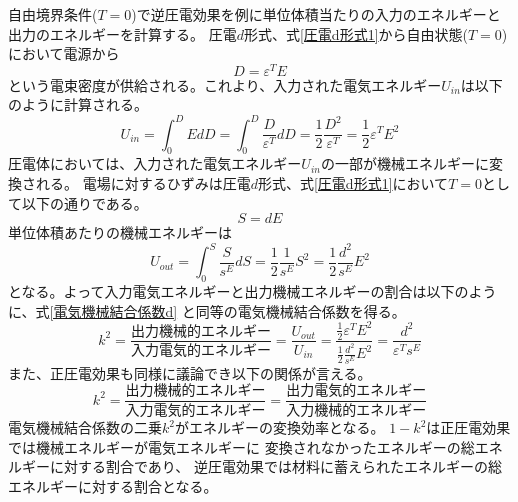 \documentclass[dvipdfmx,12pt,a4paper]{jreport}
\begin{document}
			自由境界条件($T=0$)で逆圧電効果を例に単位体積当たりの入力のエネルギーと出力のエネルギーを計算する。
			圧電$d$形式、式\eqref{圧電d形式1}から自由状態($T=0$)において電源から
			\begin{equation}
				D=\varepsilon^T E
			\end{equation}
			という電束密度が供給される。これより、入力された電気エネルギー$U_{in}$は以下のように計算される。
			\begin{equation}
				U_{in} = \int^{D}_0 E dD = \int^{D}_0 \frac{D}{\varepsilon^T} dD  
				= \frac{1}{2}\frac{D^2}{\varepsilon^T}
				= \frac{1}{2}\varepsilon^T E^2 
			\end{equation}
			圧電体においては、入力された電気エネルギー$U_{in}$の一部が機械エネルギーに変換される。
			電場に対するひずみは圧電$d$形式、式\eqref{圧電d形式1}において$T=0$として以下の通りである。
			\begin{equation}
				S = d E
			\end{equation}
			単位体積あたりの機械エネルギーは
			\begin{equation}
				U_{out} = \int^S_0 \frac{S}{s^E} d S = \frac{1}{2} \frac{1}{s^E}S^2 
				= \frac{1}{2}\frac{d^2}{s^E}E^2
			\end{equation}
			となる。よって入力電気エネルギーと出力機械エネルギーの割合は以下のように、式\eqref{電気機械結合係数d}
			と同等の電気機械結合係数を得る。
			\begin{equation}
				k^2 = \frac{\mbox{出力機械的エネルギー}}{\mbox{入力電気的エネルギー}}
				= \frac{U_{out}}{U_{in}} = \frac{\frac{1}{2}\varepsilon^T E^2}{\frac{1}{2}\frac{d^2}{s^E}E^2}
				= \frac{d^2}{\varepsilon^T s^E}
			\end{equation}
			また、正圧電効果も同様に議論でき以下の関係が言える。
			\begin{equation}
				k^2=\frac{\mbox{出力機械的エネルギー}}{\mbox{入力電気的エネルギー}}=
				\frac{\mbox{出力電気的エネルギー}}{\mbox{入力機械的エネルギー}}
				\label{電気機械結合係数の定義}
			\end{equation}
			電気機械結合係数の二乗$k^2$がエネルギーの変換効率となる。
			$1-k^2$は正圧電効果では機械エネルギーが電気エネルギーに
			変換されなかったエネルギーの総エネルギーに対する割合であり、
			逆圧電効果では材料に蓄えられたエネルギーの総エネルギーに対する割合となる。
\end{document}

